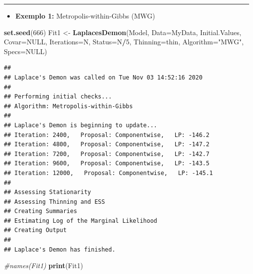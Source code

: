 \documentclass[
]{book}
\newenvironment{Shaded}{\begin{snugshade}}{\end{snugshade}}
\newcommand{\CommentTok}[1]{\textcolor[rgb]{0.56,0.35,0.01}{\textit{#1}}}
\newcommand{\DataTypeTok}[1]{\textcolor[rgb]{0.13,0.29,0.53}{#1}}
\newcommand{\DecValTok}[1]{\textcolor[rgb]{0.00,0.00,0.81}{#1}}
\newcommand{\KeywordTok}[1]{\textcolor[rgb]{0.13,0.29,0.53}{\textbf{#1}}}
\newcommand{\NormalTok}[1]{#1}
\newcommand{\OperatorTok}[1]{\textcolor[rgb]{0.81,0.36,0.00}{\textbf{#1}}}
\newcommand{\OtherTok}[1]{\textcolor[rgb]{0.56,0.35,0.01}{#1}}
\newcommand{\StringTok}[1]{\textcolor[rgb]{0.31,0.60,0.02}{#1}}
\providecommand{\tightlist}{%
  \setlength{\itemsep}{0pt}\setlength{\parskip}{0pt}}
\begin{document}
\begin{center}\rule{0.5\linewidth}{0.5pt}\end{center}

\begin{itemize}
\tightlist
\item
  \textbf{Exemplo 1:} Metropolis-within-Gibbs (MWG)
\end{itemize}

\begin{Shaded}
\begin{Highlighting}[]
\KeywordTok{set.seed}\NormalTok{(}\DecValTok{666}\NormalTok{)}
\NormalTok{Fit1 <-}\StringTok{ }\KeywordTok{LaplacesDemon}\NormalTok{(Model, }\DataTypeTok{Data=}\NormalTok{MyData, Initial.Values,}
  \DataTypeTok{Covar=}\OtherTok{NULL}\NormalTok{, }\DataTypeTok{Iterations=}\NormalTok{N, }\DataTypeTok{Status=}\NormalTok{N}\OperatorTok{/}\DecValTok{5}\NormalTok{, }\DataTypeTok{Thinning=}\NormalTok{thin,}
  \DataTypeTok{Algorithm=}\StringTok{"MWG"}\NormalTok{, }\DataTypeTok{Specs=}\OtherTok{NULL}\NormalTok{)}
\end{Highlighting}
\end{Shaded}

\begin{verbatim}
## 
## Laplace's Demon was called on Tue Nov 03 14:52:16 2020
## 
## Performing initial checks...
## Algorithm: Metropolis-within-Gibbs 
## 
## Laplace's Demon is beginning to update...
## Iteration: 2400,   Proposal: Componentwise,   LP: -146.2
## Iteration: 4800,   Proposal: Componentwise,   LP: -147.2
## Iteration: 7200,   Proposal: Componentwise,   LP: -142.7
## Iteration: 9600,   Proposal: Componentwise,   LP: -143.5
## Iteration: 12000,   Proposal: Componentwise,   LP: -145.1
## 
## Assessing Stationarity
## Assessing Thinning and ESS
## Creating Summaries
## Estimating Log of the Marginal Likelihood
## Creating Output
## 
## Laplace's Demon has finished.
\end{verbatim}

\begin{Shaded}
\begin{Highlighting}[]
\CommentTok{#names(Fit1)}
\KeywordTok{print}\NormalTok{(Fit1)}
\end{Highlighting}
\end{Shaded}
\end{document}
